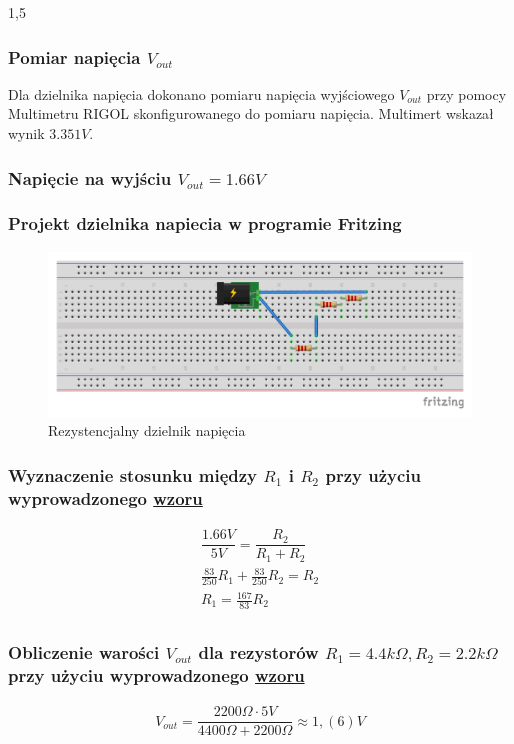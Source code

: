 \documentclass[polish,polish,a4paper]{article}
\begin{document}
\begin{spacing}{1,5}
		\subsubsection*{Pomiar napięcia $ V_{out} $}
		Dla dzielnika napięcia dokonano pomiaru napięcia wyjściowego $ V_{out} $ przy pomocy Multimetru RIGOL skonfigurowanego do pomiaru napięcia. Multimert wskazał wynik $3.351V$.
		
		
		
		
		\subsubsection{Napięcie na wyjściu $V_{out} =  1.66V $}
		
		\subsubsection*{Projekt dzielnika napiecia w programie Fritzing}
		
		\begin{figure}[H]
			\centering
			\includegraphics[scale=0.9]{1_66_bb.pdf}
			\caption{Rezystencjalny dzielnik napięcia}
			\label{fig:pod1_66}
		\end{figure}
		
		\subsubsection*{Wyznaczenie stosunku między $ R_{1} $ i $ R_{2} $ przy użyciu wyprowadzonego \hyperref[eq:vout]{wzoru}}
		\begin{gather*}
		\dfrac{1.66V}{5V} = \dfrac{R_{2}}{R_{1} + R_{2}}\\
		\frac{83}{250} R_{1} + \frac{83}{250}R_{2} = R_{2}\\
		R_{1} =\frac{167}{83} R_{2}\\
		\end{gather*}
		\subsubsection*{Obliczenie warości $ V_{out}$ dla rezystorów $ R_{1} = 4.4k\Omega, R_{2} =2.2k\Omega  $  przy użyciu wyprowadzonego \hyperref[eq:vout]{wzoru}}
		\begin{gather*}
		V_{out} = \dfrac{2200\Omega \cdot 5V}{4400\Omega + 2200\Omega} \approx 1,(6) V\\
		\end{gather*}

\end{spacing}
\end{document}
